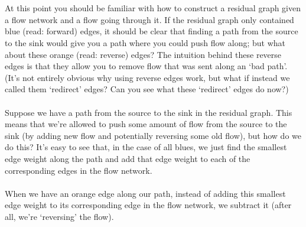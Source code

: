 \documentclass[11pt]{article}
\theoremstyle{plain}
\theoremstyle{definition}
\begin{document}
\\\\
At this point you should be familiar with how to construct a residual graph given a flow network and a flow going through it. If the residual graph only contained blue (read: forward) edges, it should be clear that finding a path from the source to the sink would give you a path where you could push flow along; but what about these orange (read: reverse) edges? The intuition behind these reverse edges is that they allow you to remove flow that was sent along an `bad path'. (It's not entirely obvious why using reverse edges work, but what if instead we called them `redirect' edges? Can you see what these `redirect' edges do now?)
\\\\
Suppose we have a path from the source to the sink in the residual graph. This means that we're allowed to push some amount of flow from the source to the sink (by adding new flow and potentially reversing some old flow), but how do we do this? It's easy to see that, in the case of all blues, we just find the smallest edge weight along the path and add that edge weight to each of the corresponding edges in the flow network. \\\\
When we have an orange edge along our path, instead of adding this smallest edge weight to its corresponding edge in the flow network, we subtract it (after all, we're `reversing' the flow).
\end{document}
